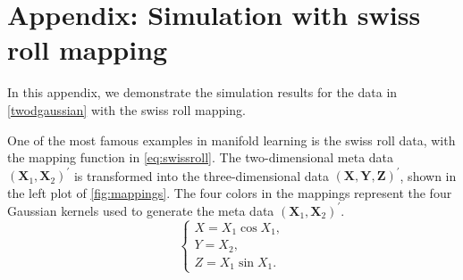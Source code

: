 \documentclass[11pt,a4paper,]{article}
\begin{document}
\clearpage

\hypertarget{swissrollappe}{%
\section{Appendix: Simulation with swiss roll mapping}\label{swissrollappe}}

In this appendix, we demonstrate the simulation results for the data in \autoref{twodgaussian} with the swiss roll mapping.

One of the most famous examples in manifold learning is the swiss roll data, with the mapping function in \eqref{eq:swissroll}. The two-dimensional meta data \((\pmb{X}_1, \pmb{X}_2)^\prime\) is transformed into the three-dimensional data \((\pmb{X}, \pmb{Y}, \pmb{Z})^\prime\), shown in the left plot of \autoref{fig:mappings}. The four colors in the mappings represent the four Gaussian kernels used to generate the meta data \((\pmb{X}_1, \pmb{X}_2)^\prime\).
\begin{equation}
\label{eq:swissroll}
\left\{
\begin{array}{lcl}
X = X_1 \cos{X_1}, \\
Y = X_2, \\
Z = X_1 \sin{X_1}.
\end{array}
\right.
\end{equation}
\end{document}
